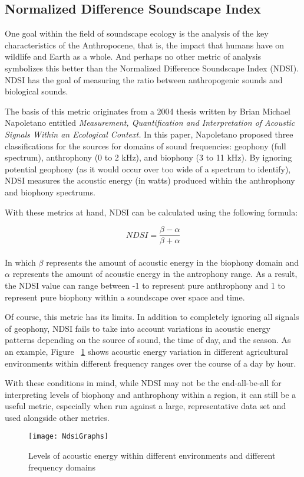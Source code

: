 \subsection{Normalized Difference Soundscape Index}
One goal within the field of soundscape ecology is the analysis of the key characteristics of the Anthropocene, that is, the impact that humans have on wildlife and Earth as a whole. And perhaps no other metric of analysis symbolizes this better than the Normalized Difference Soundscape Index (NDSI). NDSI has the goal of measuring the ratio between anthropogenic sounds and biological sounds.\par
The basis of this metric originates from a 2004 thesis written by Brian Michael Napoletano entitled \textit{Measurement, Quantification and Interpretation of Acoustic Signals Within an Ecological Context.} In this paper, Napoletano proposed three classifications for the sources for domains of sound frequencies: geophony (full spectrum), anthrophony (0 to 2 kHz), and biophony (3 to 11 kHz).\cite{napoletano} By ignoring potential geophony (as it would occur over too wide of a spectrum to identify), NDSI measures the acoustic energy (in watts) produced within the anthrophony and biophony spectrums.\par
With these metrics at hand, NDSI can be calculated using the following formula:\par

\begin{equation}
  NDSI = \frac{\beta - \alpha}{\beta + \alpha}
\end{equation} \\[-24pt]

In which \(\beta\) represents the amount of acoustic energy in the biophony domain and \(\alpha\) represents the amount of acoustic energy in the antrophony range. As a result, the NDSI value can range between -1 to represent pure anthrophony and 1 to represent pure biophony within a soundscape over space and time.\cite{gage}\par
Of course, this metric has its limits. In addition to completely ignoring all signals of geophony, NDSI fails to take into account variations in acoustic energy patterns depending on the source of sound, the time of day, and the season. As an example, Figure ~\ref{fig:ndsiGraphs} shows acoustic energy variation in different agricultural environments within different frequency ranges over the course of a day by hour.\par
With these conditions in mind, while NDSI may not be the end-all-be-all for interpreting levels of biophony and anthrophony within a region, it can still be a useful metric, especially when run against a large, representative data set and used alongside other metrics.\par

\begin{figure}
  \begin{center}
    \texttt{[image: NdsiGraphs]}
  \end{center}
  \caption{Levels of acoustic energy within different environments and different frequency domains}
  \label{fig:ndsiGraphs}
\end{figure}
